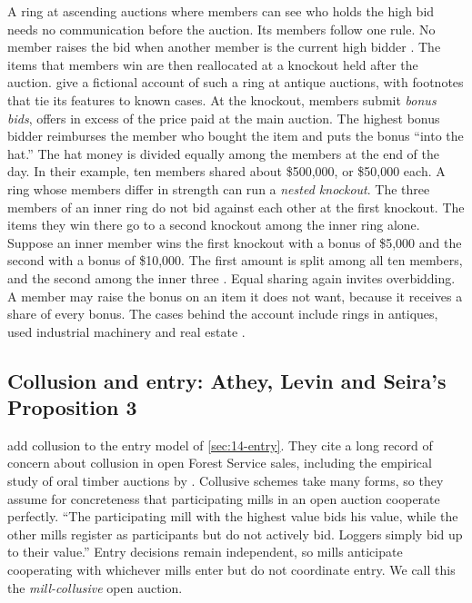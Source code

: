 A ring at ascending auctions where members can see who holds the high bid needs no communication
before the auction. Its members follow one rule. No member raises the bid when another member is the
current high bidder \citep[ch.~9, p.~194]{MarshallMarx2012}. The items that members win are then
reallocated at a knockout held after the auction. \citet[ch.~3, pp.~61--64]{MarshallMarx2012} give a
fictional account of such a ring at antique auctions, with footnotes that tie its features to known
cases. At the knockout, members submit \emph{bonus bids}, offers in excess of the price paid at the
main auction. The highest bonus bidder reimburses the member who bought the item and puts the bonus
``into the hat.'' The hat money is divided equally among the members at the end of the day. In their
example, ten members shared about \$500,000, or \$50,000 each. A ring whose members differ in strength
can run a \emph{nested knockout}. The three members of an inner ring do not bid against each other at
the first knockout. The items they win there go to a second knockout among the inner ring alone.
Suppose an inner member wins the first knockout with a bonus of \$5,000 and the second with a bonus of
\$10,000. The first amount is split among all ten members, and the second among the inner three
\citep[ch.~3, p.~63]{MarshallMarx2012}. Equal sharing
again invites overbidding. A member may raise the bonus on an item it does not want, because it
receives a share of every bonus. The cases behind the account include rings in antiques, used
industrial machinery and real estate \citep[ch.~3, p.~55, and ch.~9, p.~194]{MarshallMarx2012}.

\subsection{Collusion and entry: Athey, Levin and Seira's Proposition 3}\label{sec:14-collusion-als}

\citet[Section II.E]{AtheyLevinSeira2011} add collusion to the entry model of \cref{sec:14-entry}.
They cite a long record of concern about collusion in open Forest Service sales, including the
empirical study of oral timber auctions by \citet{BaldwinMarshallRichard1997}. Collusive schemes take
many forms, so they assume for concreteness that participating mills in an open auction cooperate
perfectly. ``The participating
mill with the highest value bids his value, while the other mills register as participants but do not
actively bid. Loggers simply bid up to their value.'' Entry decisions remain independent, so mills
anticipate cooperating with whichever mills enter but do not coordinate entry. We call this the
\emph{mill-collusive} open auction.

